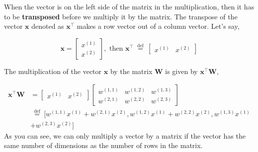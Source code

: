 \documentclass[9pt,dvipsnames]{beamer}
\begin{document}
\begin{frame}
	When the vector is on the left side of the matrix in the multiplication, then it has to be \textbf{transposed} before we multiply it by the matrix. The transpose of the vector $\mathbf{x}$ denoted as $\mathbf{x}^{\top}$ makes a row vector out of a column vector. Let's say,

	$$
		\mathbf{x}=\left[\begin{array}{l}
				x^{(1)} \\
				x^{(2)}
			\end{array}\right], \text { then } \mathbf{x}^{\top} \stackrel{\text { def }}{=}\left[\begin{array}{ll}
				x^{(1)} & x^{(2)}
			\end{array}\right]
	$$

	The multiplication of the vector $\mathbf{x}$ by the matrix $\mathbf{W}$ is given by $\mathbf{x}^{\top} \mathbf{W}$,

	\begin{equation*}
		\begin{aligned}
			\mathbf{x}^{\top} \mathbf{W} & =\left[\begin{array}{ll}
					                                      x^{(1)} & x^{(2)}
				                                      \end{array}\right]\left[\begin{array}{lll}
					                                                              w^{(1,1)} & w^{(1,2)} & w^{(1,3)} \\
					                                                              w^{(2,1)} & w^{(2,2)} & w^{(2,3)}
				                                                              \end{array}\right]                                                        \\
			                             & \stackrel{\text { def }}{=}[w^{(1,1)} x^{(1)}+w^{(2,1)} x^{(2)}, w^{(1,2)} x^{(1)}+w^{(2,2)} x^{(2)}, w^{(1,3)} x^{(1)} \\
			                             & +w^{(2,3)} x^{(2)}]
		\end{aligned}
	\end{equation*}
	As you can see, we can only multiply a vector by a matrix if the vector has the same number of dimensions as the number of rows in the matrix.
\end{frame}
\end{document}
